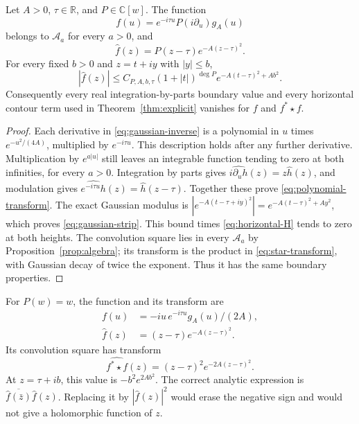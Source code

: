 \documentclass[11pt]{article}
\numberwithin{equation}{section}
\newcommand{\R}{\mathbb R}
\newcommand{\C}{\mathbb C}
\newcommand{\A}{\mathcal A}
\begin{document}
\begin{proposition}
\label{prop:polynomial-gaussian}
Let $A>0$, $\tau\in\R$, and $P\in\C[w]$.  The function
\begin{equation}
 f(u)=e^{-i\tau u}P(i\partial_u)g_A(u)
 \label{eq:gaussian-inverse}
\end{equation}
belongs to $\A_a$ for every $a>0$, and
\begin{equation}
 \widehat f(z)=P(z-\tau)e^{-A(z-\tau)^2}.
 \label{eq:polynomial-transform}
\end{equation}
For every fixed $b>0$ and $z=t+iy$ with $|y|\leq b$,
\begin{equation}
 |\widehat f(z)|\leq C_{P,A,b,\tau}(1+|t|)^{\deg P}
                             e^{-A(t-\tau)^2+A b^2}.
 \label{eq:gaussian-strip}
\end{equation}
Consequently every real integration-by-parts boundary value and every
horizontal contour term used in Theorem~\ref{thm:explicit} vanishes for
$f$ and $f^*\star f$.
\end{proposition}

\begin{proof}
Each derivative in \eqref{eq:gaussian-inverse} is a polynomial in $u$ times
$e^{-u^2/(4A)}$, multiplied by $e^{-i\tau u}$.
This description holds after any further derivative.
Multiplication by $e^{a|u|}$ still leaves an integrable function tending
to zero at both infinities, for every $a>0$.
Integration by parts gives
$\widehat{i\partial_u h}(z)=z\widehat h(z)$, and modulation gives
$\widehat{e^{-i\tau u}h}(z)=\widehat h(z-\tau)$.
Together these prove \eqref{eq:polynomial-transform}.
The exact Gaussian modulus is
$|e^{-A(t-\tau+iy)^2}|=e^{-A(t-\tau)^2+Ay^2}$,
which proves \eqref{eq:gaussian-strip}.
This bound times \eqref{eq:horizontal-H} tends to zero at both heights.
The convolution square lies in every $\A_a$ by
Proposition~\ref{prop:algebra}; its transform is the product in
\eqref{eq:star-transform}, with Gaussian decay of twice the exponent.
Thus it has the same boundary properties.
\end{proof}

\begin{example}
For $P(w)=w$, the function and its transform are
\[
 \begin{aligned}
 f(u)&=-iu\,e^{-i\tau u}g_A(u)/(2A),\\
 \widehat f(z)&=(z-\tau)e^{-A(z-\tau)^2}.
 \end{aligned}
\]
Its convolution square has transform
\[
 \widehat{f^*\star f}(z)=(z-\tau)^2e^{-2A(z-\tau)^2}.
\]
At $z=\tau+ib$, this value is $-b^2e^{2Ab^2}$.
The correct analytic expression is
$\overline{\widehat f(\bar z)}\widehat f(z)$.
Replacing it by $|\widehat f(z)|^2$ would erase the negative sign and would
not give a holomorphic function of $z$.
\end{example}
\end{document}
